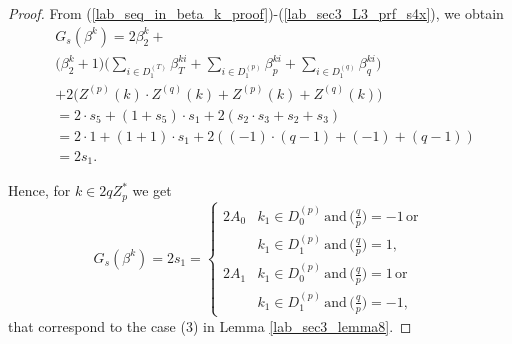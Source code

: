 \documentclass{mcom-l}
\theoremstyle{definition}
\numberwithin{equation}{section}
\begin{document}
\begin{proof}
     From (\ref{lab_seq_in_beta_k_proof})-(\ref{lab_sec3_L3_prf_s4x}), we obtain
     \begin{equation*}
     \begin{split}
     &G_{s}(\beta^{k})=2\beta_{2}^{k}+\\
         &\biggl(\beta_{2}^{k}+1\biggr)\biggl(\sum_{i\in D_{1}^{(T)}}\beta_{T}^{ki}+\sum_{i\in D_{1}^{(p)}}\beta_{p}^{ki}+\sum_{i\in D_{1}^{(q)}}\beta_{q}^{ki}\biggr)\\
         &+2\biggl(Z^{(p)}(k)\cdot Z^{(q)}(k)+Z^{(p)}(k)+Z^{(q)}(k)\biggr)\\
         &=2\cdot s_{5}+(1+s_{5})\cdot s_{1}+2(s_{2}\cdot s_{3}+s_{2}+s_{3})\\
         &=2\cdot 1+(1+1)\cdot s_{1}+2((-1)\cdot(q-1)+(-1)+(q-1))\\
         &=2 s_{1}.
     \end{split}
     \end{equation*}
     
     Hence, for $ k\in 2qZ_{p}^{*} $ we get 
     \begin{equation*}
     G_{s}(\beta^{k})=2 s_{1}=
     \begin{cases}
           2A_{0}&k_{1}\in D_{0}^{(p)}\,\text{and}\,\bigl(\frac{q}{p}\bigr)=-1\,\text{or}\,\\
           &k_{1}\in D_{1}^{(p)}\,\text{and}\,\bigl(\frac{q}{p}\bigr)=1,\\
           2A_{1}&k_{1}\in D_{0}^{(p)}\,\text{and}\,\bigl(\frac{q}{p}\bigr)=1\,\text{or}\,\\
           &k_{1}\in D_{1}^{(p)}\,\text{and}\,\bigl(\frac{q}{p}\bigr)=-1,
           \end{cases}
     \end{equation*}
     that correspond to the case (3) in Lemma \ref{lab_sec3_lemma8}.
     \end{proof} 
     
\end{document}
